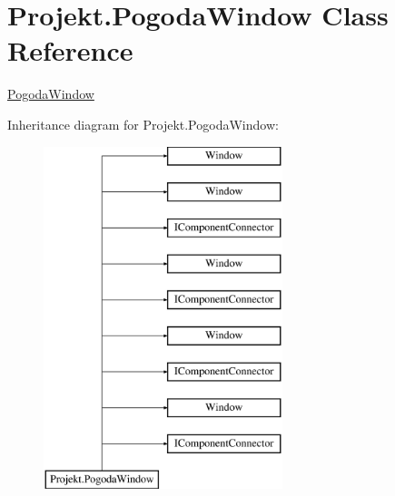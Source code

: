 \hypertarget{class_projekt_1_1_pogoda_window}{}\section{Projekt.\+Pogoda\+Window Class Reference}
\label{class_projekt_1_1_pogoda_window}


\mbox{\hyperlink{class_projekt_1_1_pogoda_window}{Pogoda\+Window}}  


Inheritance diagram for Projekt.\+Pogoda\+Window\+:\begin{figure}[H]
\begin{center}
\leavevmode
\includegraphics[height=10.000000cm]{class_projekt_1_1_pogoda_window}
\end{center}
\end{figure}
